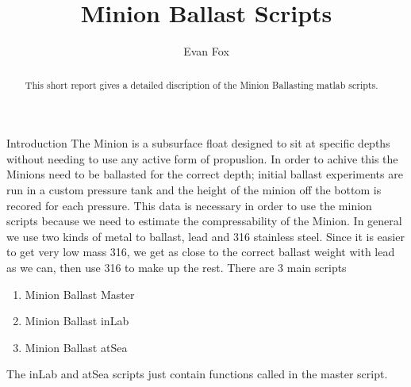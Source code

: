 \documentclass[11pt]{article}
\author{Evan Fox}
\title{Minion Ballast Scripts}
\theoremstyle{break}
\begin{document}
\maketitle
\tableofcontents
\begin{abstract}
    This short report gives a detailed discription of the Minion Ballasting matlab scripts. 
    
\end{abstract}



\begin{section}{Introduction}
    The Minion is a subsurface float designed to sit at specific depths without needing to use any active form of propuslion. 
    In order to achive this the Minions need to be ballasted for the correct depth; initial ballast experiments are run in 
    a custom pressure tank and the height of the minion off the bottom is recored for each pressure. This data is necessary in order 
    to use the minion scripts because we need to estimate the compressability of the Minion. In general we use two kinds of metal to ballast, 
    lead and 316 stainless steel. Since it is easier to get very low mass 316, we get as close to the correct ballast weight with lead as we can, 
    then use 316 to make up the rest. There are 3 main scripts 
    \begin{enumerate}
        \item Minion Ballast Master
        \item Minion Ballast inLab
        \item Minion Ballast atSea
    \end{enumerate} 
    The inLab and atSea scripts just contain functions called in the master script. 

\end{section}
\end{document}
